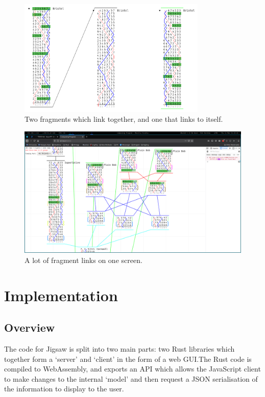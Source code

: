 \documentclass[12pt]{article}
\begin{document}
\begin{figure}
    \centering
    \includegraphics[width=0.8\textwidth]{linking-2}
    \caption{Two fragments which link together, and one that links to itself.}\label{fig:linking}
\end{figure}

\begin{figure}[h!]
    \centering
    \includegraphics[width=\textwidth]{linking-insane}
    \caption{A lot of fragment links on one screen.}\label{fig:linking-insane}
\end{figure}



\pagebreak

\section{Implementation}

\subsection{Overview}

The code for Jigsaw is split into two main parts: two Rust libraries which together form a `server'
and `client' in the form of a web GUI.\@  The Rust code is compiled to WebAssembly, and exports an
API which allows the JavaScript client to make changes to the internal `model' and then request a
JSON serialisation of the information to display to the user.
\end{document}
